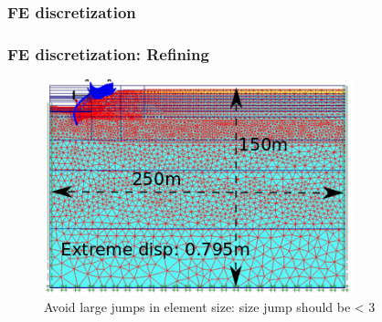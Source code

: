 \documentclass[handout]{beamer}
\begin{document}
\begin{frame}
\frametitle{FE discretization}
\end{frame}

\begin{frame}
\frametitle{FE discretization: Refining}
\begin{figure}[ht]
	\centering
	\includegraphics[width=0.8\textwidth]{figs/refined-mesh.png}
	\caption*{Avoid large jumps in element size: size jump should be < 3}
\end{figure}
\end{frame}
\end{document}
